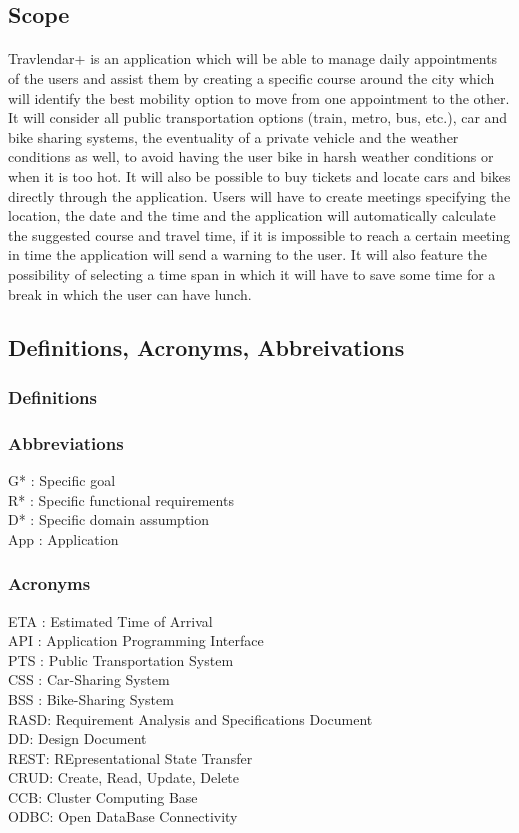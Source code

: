 \documentclass{article}
\begin{document}
		\subsection{Scope}
			\paragraph{}
Travlendar+ is an application which will be able to manage daily appointments of the users and assist them by creating a specific course around the city which will identify the best mobility option to move from one appointment to the other. It will consider all public transportation options (train, metro, bus, etc.), car and bike sharing systems, the eventuality of a private vehicle and the weather conditions as well, to avoid having the user bike in harsh weather conditions or when it is too hot. It will also be possible to buy tickets and locate cars and bikes directly through the application. Users will have to create meetings specifying the location, the date and the time and the application will automatically calculate the suggested course and travel time, if it is impossible to reach a certain meeting in time the application will send a warning to the user. It will also feature the possibility of selecting a time span in which it will have to save some time for a break in which the user can have lunch. 
		\subsection{Definitions, Acronyms, Abbreivations}
			\subsubsection{Definitions}
			\subsubsection{Abbreviations}
G* : Specific goal\\ R* : Specific functional requirements\\ D* : Specific domain assumption \\ App : Application
			\subsubsection{Acronyms}
ETA : Estimated Time of Arrival\\ API : Application Programming Interface\\ PTS : Public Transportation System\\ CSS : Car-Sharing System\\ BSS : Bike-Sharing System\\RASD: Requirement Analysis and Specifications Document\\DD: Design Document\\REST: REpresentational State Transfer\\CRUD: Create, Read, Update, Delete\\CCB: Cluster Computing Base\\ODBC: Open DataBase Connectivity
\end{document}
